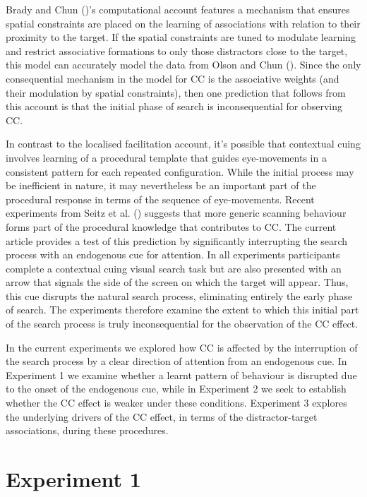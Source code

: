 \documentclass[
  man,
  floatsintext,
  longtable,
  nolmodern,
  notxfonts,
  notimes,
  colorlinks=true,linkcolor=blue,citecolor=blue,urlcolor=blue]{apa7}
\begin{document}
Brady and Chun ()'s computational account
features a mechanism that ensures spatial constraints are placed on the
learning of associations with relation to their proximity to the target.
If the spatial constraints are tuned to modulate learning and restrict
associative formations to only those distractors close to the target,
this model can accurately model the data from Olson and Chun
(). Since the only consequential mechanism
in the model for CC is the associative weights (and their modulation by
spatial constraints), then one prediction that follows from this account
is that the initial phase of search is inconsequential for observing CC.

In contrast to the localised facilitation account, it's possible that
contextual cuing involves learning of a procedural template that guides
eye-movements in a consistent pattern for each repeated configuration.
While the initial process may be inefficient in nature, it may
nevertheless be an important part of the procedural response in terms of
the sequence of eye-movements. Recent experiments from Seitz et al.
() suggests that more generic scanning
behaviour forms part of the procedural knowledge that contributes to CC.
The current article provides a test of this prediction by significantly
interrupting the search process with an endogenous cue for attention. In
all experiments participants complete a contextual cuing visual search
task but are also presented with an arrow that signals the side of the
screen on which the target will appear. Thus, this cue disrupts the
natural search process, eliminating entirely the early phase of search.
The experiments therefore examine the extent to which this initial part
of the search process is truly inconsequential for the observation of
the CC effect.

In the current experiments we explored how CC is affected by the
interruption of the search process by a clear direction of attention
from an endogenous cue. In Experiment 1 we examine whether a learnt
pattern of behaviour is disrupted due to the onset of the endogenous
cue, while in Experiment 2 we seek to establish whether the CC effect is
weaker under these conditions. Experiment 3 explores the underlying
drivers of the CC effect, in terms of the distractor-target
associations, during these procedures.

\section{Experiment 1}\label{experiment-1}
\end{document}
